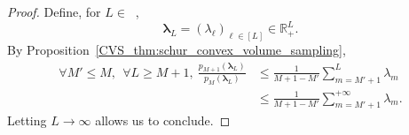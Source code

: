 \documentclass[twoside,11pt]{book}
\numberwithin{theorem}{chapter}
\numberwithin{definition}{chapter}
\numberwithin{proposition}{chapter}
\numberwithin{corollary}{chapter}
\numberwithin{example}{chapter}
\numberwithin{lemma}{chapter}
\numberwithin{assumption}{chapter}
\numberwithin{equation}{chapter}
\numberwithin{figure}{chapter}
\DeclareMathOperator{\Ns}{\mathbb{N}^{*}}
\newcommand{\pc}[1]{\textcolor{blue}{#1}}
\begin{document}
\begin{proof}
Define, for $L \in \Ns$,
\begin{equation}
\bm{\lambda}_{L} = (\lambda_{\ell})_{\ell \in [L]} \in \mathbb{R}_{+}^{L}.
\end{equation}
%
By Proposition~\ref{CVS_thm:schur_convex_volume_sampling},
\begin{align}\label{CVS_eq:ineq_lambda_L}
\forall M' \leq M, \:\: \forall L \geq M+1, \: \frac{p_{M+1}(\bm{\lambda}_{L})}{p_{M}(\bm{\lambda}_{L})} & \leq \frac{1}{M+1-M'}\sum\limits_{m = M'+1}^{L} \lambda_{m}\\
& \leq \frac{1}{M+1-M'}\sum\limits_{m = M'+1}^{+\infty} \lambda_{m}.
\end{align}
Letting $L\rightarrow \infty$ allows us to conclude.
\end{proof}
\end{document}
